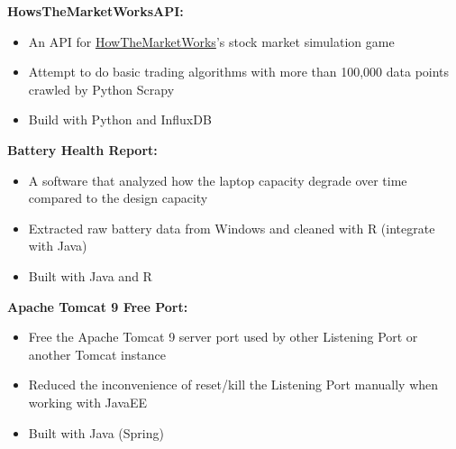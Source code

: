 \documentclass[a4paper,11pt]{article}
\begin{document}
\begin{flushleft}
	
	\textbf{HowsTheMarketWorksAPI:}
	\vspace{-\topsep}
	\begin{itemize}
		\setlength{\parskip}{0pt}
		\setlength{\itemsep}{0pt plus 1pt}
		\item An API for \href{https://www.howthemarketworks.com/}{HowTheMarketWorks}'s stock market simulation game 
		\item Attempt to do basic trading algorithms with more than 100,000 data points crawled by Python Scrapy \item Build with Python and InfluxDB
	\end{itemize}	
	
	\textbf{Battery Health Report:} 
	\vspace{-\topsep}
	\begin{itemize}
		\setlength{\parskip}{0pt}
		\setlength{\itemsep}{0pt plus 1pt}
		\item A software that analyzed how the laptop capacity degrade over time compared to the design capacity 
		\item Extracted raw battery data from Windows and cleaned with R (integrate with Java)
		\item Built with Java and R
	\end{itemize}
	
	\textbf{Apache Tomcat 9 Free Port:} 
	\vspace{-\topsep}
	\begin{itemize}
		\setlength{\parskip}{0pt}
		\setlength{\itemsep}{0pt plus 1pt}
		\item Free the Apache Tomcat 9 server port used by other Listening Port or another Tomcat instance
		\item Reduced the inconvenience of reset/kill the Listening Port manually when working with JavaEE
		\item Built with Java (Spring)
	\end{itemize}
\centering{\noindent\makebox{\rule{8cm}{1.5pt}}}
\end{flushleft}
\end{document}
